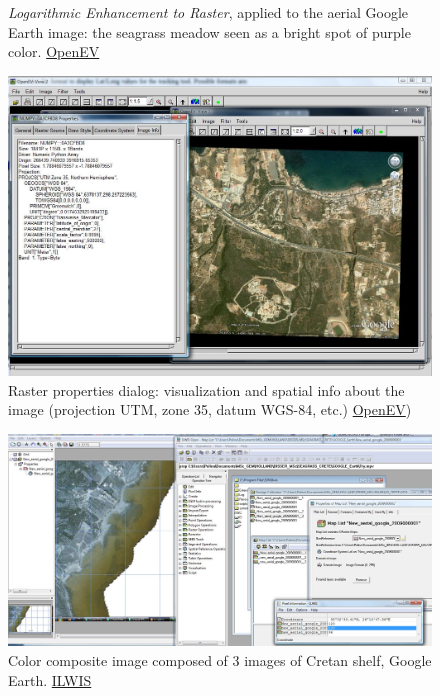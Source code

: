 \documentclass[11pt]{article}
\begin{document}
\begin{appendices}
\begin{figure}[H]
\begin{center}
	\caption{\textit{Logarithmic Enhancement to Raster}, applied to the aerial Google Earth image: the seagrass meadow seen as a bright spot of purple color. \href{http://openev.sourceforge.net/}{OpenEV}}\label{fig:A.40}	
	\end{center}	
\end{figure}
\begin{figure}[H]
	\begin{center}
		\includegraphics[scale=0.25]{OpenEV-1.jpg}
		\caption{Raster properties dialog: visualization and spatial info about the image (projection UTM, zone 35, datum WGS-84, etc.)  \href{http://openev.sourceforge.net/}{OpenEV})}\label{fig:A.41}	
	\end{center}	
\end{figure}
\begin{figure}[H]
	\begin{center}
		\includegraphics[scale=0.25]{Ilwis-2.jpg}
		\caption{Color composite image composed of 3 images of Cretan shelf, Google Earth. \href{http://www.ilwis.org/}{ILWIS}}\label{fig:A.42}	

\end{center}
\end{figure}
\end{appendices}
\end{document}
